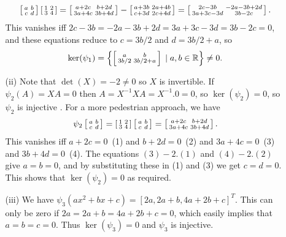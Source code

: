 \documentclass[a4paper]{article}
\begin{document}
\begin{solution}
\begin{itemize}
\begin{itemize}
\[         \left[\begin{smallmatrix} a&b\\ c&d\end{smallmatrix}\right] \left[\begin{smallmatrix} 1&2\\3&4\end{smallmatrix}\right] = 
         \left[\begin{smallmatrix} a+2c& b+2d\\ 3a+4c& 3b+4d \end{smallmatrix}\right] - 
         \left[\begin{smallmatrix} a+3b & 2a+4b\\ c+3d & 2c+4d \end{smallmatrix}\right] = 
         \left[\begin{smallmatrix} 2c-3b & -2a-3b+2d \\ 3a+3c-3d & 3b-2c \end{smallmatrix}\right]. 
     \]
     This vanishes iff $2c-3b=-2a-3b+2d=3a+3c-3d=3b-2c=0$, and these
     equations reduce to $c=3b/2$ and $d=3b/2+a$, so 
     \[ \ker(\psi_1) = \left\{\left[\begin{smallmatrix} a& b \\ 3b/2 & 3b/2+a\end{smallmatrix}\right] \;|\;
           a,b\in{\mathbb{R}}\right\} \neq 0.
     \]
    \item[(ii)] Note that $\det(X)=-2\neq 0$ so $X$ is invertible.  If
     $\psi_2(A)=XA=0$ then $A=X^{-1}XA=X^{-1}.0=0$, so
     $\ker(\psi_2)=0$, so $\psi_2$ is injective .  For a more
     pedestrian approach, we have 
     \[ \psi_2\left[\begin{smallmatrix} a&b\\ c&d\end{smallmatrix}\right] =
         \left[\begin{smallmatrix} 1&2\\3&4\end{smallmatrix}\right] \left[\begin{smallmatrix} a&b\\ c&d\end{smallmatrix}\right] = 
         \left[\begin{smallmatrix} a+2c& b+2d\\ 3a+4c& 3b+4d \end{smallmatrix}\right]. 
     \] 
     This vanishes iff $a+2c=0$~(1) and $b+2d=0$~(2) and $3a+4c=0$~(3)
     and $3b+4d=0$~(4).  The equations $(3)-2.(1)$ and $(4)-2.(2)$
     give $a=b=0$, and by substituting these in (1) and (3) we get
     $c=d=0$.  This shows that $\ker(\psi_2)=0$ as required.
    \item[(iii)] We have $\psi_3(ax^2+bx+c)=[2a,2a+b,4a+2b+c]^T$.
     This can only be zero if $2a=2a+b=4a+2b+c=0$, which easily
     implies that $a=b=c=0$.  Thus $\ker(\psi_3)=0$ and $\psi_3$ is
     injective.  
   \end{itemize}
 \end{itemize}
\end{solution}
\end{document}
